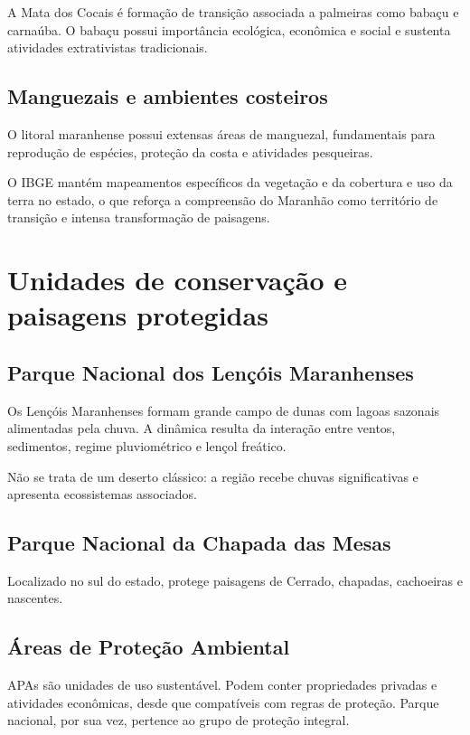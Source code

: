 A Mata dos Cocais é formação de transição associada a palmeiras como babaçu e carnaúba. O babaçu possui importância ecológica, econômica e social e sustenta atividades extrativistas tradicionais.

\subsection{Manguezais e ambientes costeiros}

O litoral maranhense possui extensas áreas de manguezal, fundamentais para reprodução de espécies, proteção da costa e atividades pesqueiras.

O IBGE mantém mapeamentos específicos da vegetação e da cobertura e uso da terra no estado, o que reforça a compreensão do Maranhão como território de transição e intensa transformação de paisagens.

\section{Unidades de conservação e paisagens protegidas}

\subsection{Parque Nacional dos Lençóis Maranhenses}

Os Lençóis Maranhenses formam grande campo de dunas com lagoas sazonais alimentadas pela chuva. A dinâmica resulta da interação entre ventos, sedimentos, regime pluviométrico e lençol freático.

Não se trata de um deserto clássico: a região recebe chuvas significativas e apresenta ecossistemas associados.

\subsection{Parque Nacional da Chapada das Mesas}

Localizado no sul do estado, protege paisagens de Cerrado, chapadas, cachoeiras e nascentes.

\subsection{Áreas de Proteção Ambiental}

APAs são unidades de uso sustentável. Podem conter propriedades privadas e atividades econômicas, desde que compatíveis com regras de proteção. Parque nacional, por sua vez, pertence ao grupo de proteção integral.

